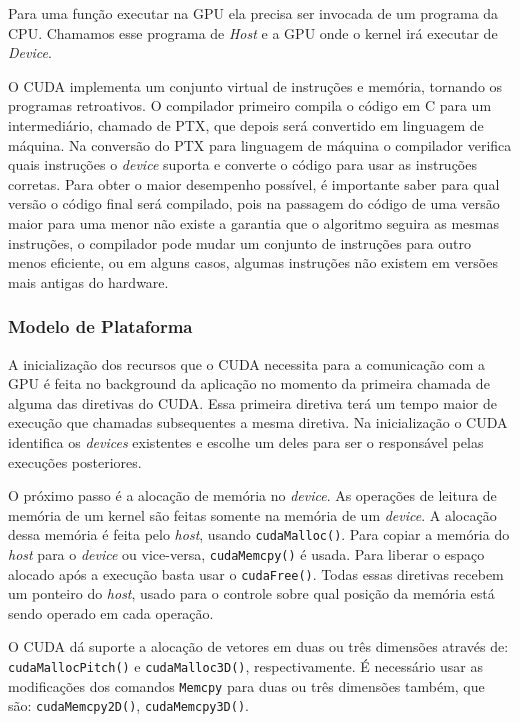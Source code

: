Para uma função executar na GPU ela precisa ser invocada de um programa da CPU. Chamamos esse programa de \textit{Host}
e a GPU onde o kernel irá executar de \textit{Device}.

O CUDA implementa um conjunto virtual de instruções e memória, tornando os programas retroativos. O compilador
primeiro compila o código em C para um intermediário, chamado de PTX, que depois será convertido em linguagem
de máquina. Na conversão do PTX para linguagem de máquina o compilador verifica quais instruções o \textit{device}
suporta e converte o código para usar as instruções corretas.
Para obter o maior desempenho possível, é importante saber para qual versão o código final será compilado, 
pois na passagem do código de uma versão maior para uma menor não existe a garantia que o algoritmo seguira as mesmas instruções, 
o compilador pode mudar um conjunto de instruções para outro menos eficiente, ou em alguns casos, algumas instruções não existem em
versões mais antigas do hardware.

\subsubsection{Modelo de Plataforma}
A inicialização dos recursos que o CUDA necessita para a comunicação com a GPU é feita no background da
aplicação no momento da primeira chamada de alguma das diretivas do CUDA. Essa primeira diretiva terá um
tempo maior de execução que chamadas subsequentes a mesma diretiva. Na inicialização o CUDA identifica
os \textit{devices} existentes e escolhe um deles para ser o responsável pelas execuções posteriores.

O próximo passo é a alocação de memória no \textit{device}. As operações de leitura de memória de um kernel são feitas somente
na memória de um \textit{device}. A alocação dessa memória é feita pelo \textit{host}, usando \verb#cudaMalloc()#. 
Para copiar a memória do \textit{host} para o \textit{device} ou vice-versa,
\verb#cudaMemcpy()# é usada. Para liberar o espaço alocado após a execução basta usar o \verb#cudaFree()#.
Todas essas diretivas recebem um ponteiro do \textit{host}, usado para o controle sobre qual posição da memória está sendo
operado em cada operação.

O CUDA dá suporte a alocação de vetores em duas ou três dimensões através de: \verb#cudaMallocPitch()# e 
\verb#cudaMalloc3D()#, respectivamente. É necessário usar as modificações dos comandos \verb#Memcpy# para
duas ou três dimensões também, que são: \verb#cudaMemcpy2D()#, \verb#cudaMemcpy3D()#.

